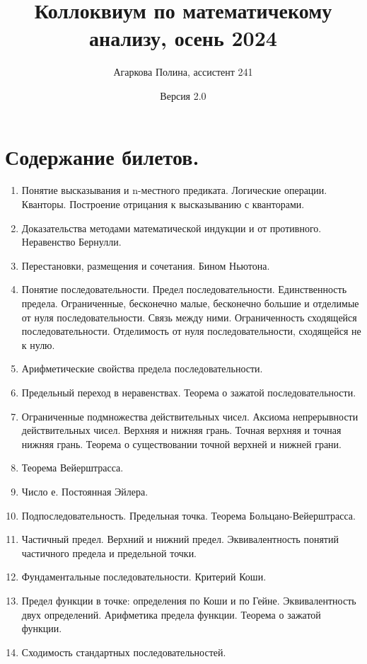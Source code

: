 \documentclass[12pt]{article}
\title{Коллоквиум по математичекому анализу, осень 2024}
\author{Агаркова Полина, ассистент 241}
\date{Версия 2.0}
\begin{document}
\maketitle

\tableofcontents %

\newpage %

\section*{Содержание билетов.}
\begin{enumerate}
    \item Понятие высказывания и n-местного предиката. Логические операции. Кванторы. Построение отрицания к высказыванию с кванторами. 
    \item Доказательства методами математической индукции и от противного. Неравенство Бернулли. 
    \item Перестановки, размещения и сочетания. Бином Ньютона. 
    \item Понятие последовательности. Предел последовательности. Единственность предела. Ограниченные, бесконечно малые, бесконечно большие  и отделимые от нуля последовательности. Связь между ними. Ограниченность сходящейся последовательности. Отделимость от нуля последовательности, сходящейся не к нулю.
    \item Арифметические свойства предела последовательности.
    \item Предельный переход в неравенствах. Теорема о зажатой последовательности.
    \item Ограниченные подмножества действительных чисел. Аксиома непрерывности действительных чисел. Верхняя и нижняя грань. Точная верхняя и точная нижняя грань. Теорема о существовании точной верхней и нижней грани.
    \item Теорема Вейерштрасса.
    \item Число е. Постоянная Эйлера.
    \item Подпоследовательность. Предельная точка. Теорема Больцано-Вейерштрасса.
    \item Частичный предел. Верхний и нижний предел. Эквивалентность понятий частичного предела и предельной точки.
    \item Фундаментальные последовательности. Критерий Коши.
    \item Предел функции в точке: определения по Коши и по Гейне. Эквивалентность двух определений. Арифметика предела функции. Теорема о зажатой функции. 
    \item Сходимость стандартных последовательностей.

\end{enumerate}
\end{document}

